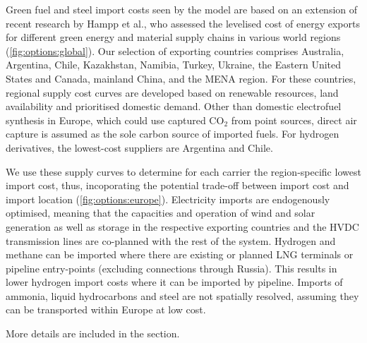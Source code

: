 Green fuel and steel import costs seen by the model are based on an extension of
recent research by Hampp et al.,\cite{hamppImportOptions2023} who assessed the
levelised cost of energy exports for different green energy and material supply
chains in various world regions (\cref{fig:options:global}). Our selection of
exporting countries comprises Australia, Argentina, Chile, Kazakhstan, Namibia,
Turkey, Ukraine, the Eastern United States and Canada, mainland China, and the
MENA region. For these countries, regional supply cost curves are developed
based on renewable resources, land availability and prioritised domestic demand.
Other than domestic electrofuel synthesis in Europe, which could use captured
CO$_2$ from point sources, direct air capture is assumed as the sole carbon
source of imported fuels. For hydrogen derivatives, the lowest-cost suppliers
are Argentina and Chile.

We use these supply curves to determine for each carrier the region-specific
lowest import cost, thus, incoporating the potential trade-off between import
cost and import location (\cref{fig:options:europe}). Electricity imports are
endogenously optimised, meaning that the capacities and operation of wind and
solar generation as well as storage in the respective exporting countries and
the HVDC transmission lines are co-planned with the rest of the system. Hydrogen
and methane can be imported where there are existing or planned LNG terminals or
pipeline entry-points (excluding connections through Russia). This results in
lower hydrogen import costs where it can be imported by pipeline. Imports of
ammonia, liquid hydrocarbons and steel are not spatially resolved, assuming they
can be transported within Europe at low cost. 

More details are included in the  section.







